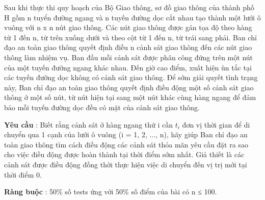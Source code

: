 Sau khi thực thi quy hoạch của Bộ Giao thông, sơ đồ giao thông của thành phố H gồm n tuyển đường ngang và n tuyến đường dọc cắt nhau tạo thành một lưới ô vuông với n x n nút giao thông. Các nút giao thông được gán tọa độ theo hàng từ 1 đến n, từ trên xuống dưới và theo cột từ 1 đến n, từ trái sang phải. Ban chỉ đạo an toàn giao thông quyết định điều n cảnh sát giao thông đến các nút giao thông làm nhiệm vụ. Ban đầu mỗi cảnh sát được phân công đứng trên một nút của một tuyến đường ngang khác nhau. Đến giờ cao điểm, xuất hiện ùn tắc tại các tuyến đường dọc không có cảnh sát giao thông. Để sớm giải quyết tình trạng này, Ban chỉ đạo an toàn giao thông quyết định điều động một số cảnh sát giao thông ở một số nút, từ nút hiện tại sang một nút khác cùng hàng ngang để đảm bảo mỗi tuyến đường dọc đều có mặt của cảnh sát giao thông.

\textbf{Yêu cầu } : Biết rằng cảnh sát ở hàng ngang thứ i cần $t_{i}$ đơn vị thời gian để di chuyển qua 1 cạnh của lưới ô vuông (i = 1, 2, ..., n), hãy giúp Ban chỉ đạo an toàn giao thông tìm cách điều động các cảnh sát thỏa mãn yêu cầu đặt ra sao cho việc điều động được hoàn thành tại thời điểm sớm nhất. Giả thiết là các cảnh sát được điều động đồng thời thực hiện việc di chuyển đến vị trị mới tại thời điểm 0.

\textbf{Ràng buộc } : 50\% số tests ứng với 50\% số điểm của bài có n ≤ 100.